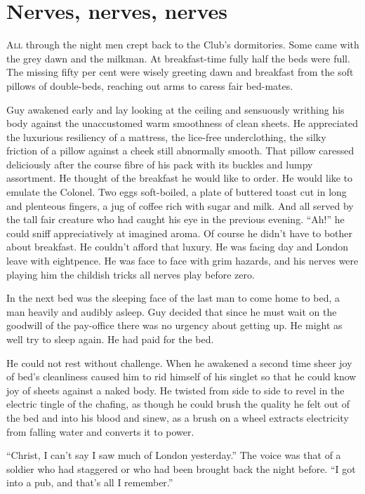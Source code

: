 \chapter*{\textsf{Nerves, nerves, nerves}}

A\textsc{ll} through the night men crept back to the Club's dormitories. Some came with the grey dawn and the milkman. At breakfast-time fully half the beds were full. The missing fifty per cent were wisely greeting dawn and breakfast from the soft pillows of double-beds, reaching out arms to caress fair bed-mates.

Guy awakened early and lay looking at the ceiling and sensuously writhing his body against the unaccustomed warm smoothness of clean sheets. He appreciated the luxurious resiliency of a mattress, the lice-free underclothing, the silky friction of a pillow against a cheek still abnormally smooth. That pillow caressed deliciously after the course fibre of his pack with its buckles and lumpy assortment. He thought of the breakfast he would like to order. He would like to emulate the Colonel. Two eggs soft-boiled, a plate of buttered toast cut in long and plenteous fingers, a jug of coffee rich with sugar and milk. And all served by the tall fair creature who had caught his eye in the previous evening. ``Ah!'' he could sniff appreciatively at imagined aroma. Of course he didn't have to bother about breakfast. He couldn't afford that luxury. He was facing day and London leave with eightpence. He was face to face with grim hazards, and his nerves were playing him the childish tricks all nerves play before zero.

In the next bed was the sleeping face of the last man to come home to bed, a man heavily and audibly asleep. Guy decided that since he must wait on the goodwill of the pay-office there was no urgency about getting up. He might as well try to sleep again. He had paid for the bed.

He could not rest without challenge. When he awakened a second time sheer joy of bed's cleanliness caused him to rid himself of his singlet so that he could know joy of sheets against a naked body. He twisted from side to side to revel in the electric tingle of the chafing, as though he could brush the quality he felt out of the bed and into his blood and sinew, as a brush on a wheel extracts electricity from falling water and converts it to power.

``Christ, I can't say I saw much of London yesterday.'' The voice was that of a soldier who had staggered or who had been brought back the night before. ``I got into a pub, and that's all I remember.''

